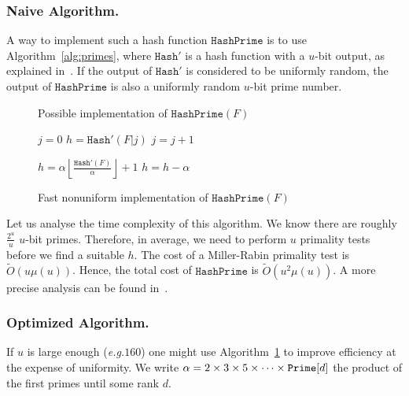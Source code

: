 \documentclass{llncs}
\newcommand{\Oapp}{\ensuremath{\tilde{O}}}
\newcommand{\eg}{\textit{e.g.}\xspace}
\newcommand{\Hash}{\ensuremath{\mathtt{Hash}}}
\newcommand{\HashPrime}{\ensuremath{\mathtt{HashPrime}}}
\begin{document}
\subsubsection{Naive Algorithm.}
\label{sec:basichashprime}

A way to implement such a hash function $\HashPrime$ is to use Algorithm~\ref{alg:primes}, where $\Hash'$ is a hash function with a $u$-bit output, as explained in~\cite{PKC:AbdBenPoi13}.
If the output of $\Hash'$ is considered to be uniformly random, the output of $\HashPrime$ is also a uniformly random $u$-bit prime number.

\begin{figure}[t]
\centering
\begin{minipage}[t]{0.49\textwidth}
\begin{algorithm}[H]
  \caption{Possible implementation of $\HashPrime(F)$}
  \label{alg:primes}
  \begin{algorithmic}[1]
  \State $j=0$
\Repeat
\State $h = \Hash'(F|j)$
\State $j = j+1$
\State {}
  \end{algorithmic}
\end{algorithm}
\end{minipage}
\begin{minipage}[t]{0.49\textwidth}
\begin{algorithm}[H]
  \caption{Fast nonuniform implementation of $\HashPrime(F)$}
  \label{alg:scanprime}
  \begin{algorithmic}[1]
  \State $h =\alpha \left\lfloor\frac{\Hash'(F)}{\alpha}\right\rfloor+1$
\State $h = h-\alpha$
\EndWhile
\State {}
  \end{algorithmic}
\end{algorithm}
\end{minipage}
\end{figure}

Let us analyse the time complexity of this algorithm.
We know there are roughly $\frac{2^u}{u}$ $u$-bit primes.
Therefore, in average, we need to perform $u$ primality tests before we find a suitable $h$.
The cost of a Miller-Rabin primality test is $\Oapp(u \mu(u))$.
Hence, the total cost of $\HashPrime$ is $\Oapp(u^2 \mu(u))$.
A more precise analysis can be found in~\cite{PKC:AbdBenPoi13}.

\subsubsection{Optimized Algorithm.}
If $u$ is large enough (\eg $160$) one might %
use Algorithm~\ref{alg:scanprime} to improve efficiency at the expense of uniformity. We write $\alpha=2\times 3\times 5\times \cdots \times \mbox{{\tt Prime}}[d]$ the product of the first primes until some rank $d$.
\end{document}
